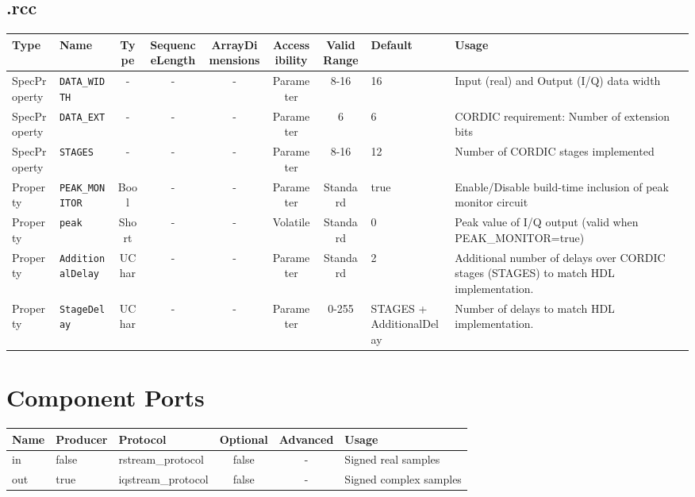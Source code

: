 \begin{landscape}
\subsection*{\comp.rcc}
\begin{scriptsize}
	\begin{tabular}{|p{3cm}|p{2cm}|c|c|c|c|c|p{1cm}|p{6cm}|}
		\hline
		\rowcolor{blue}
		Type         & Name              & Type & SequenceLength & ArrayDimensions & Accessibility & Valid Range & Default & Usage                                    \\
		\hline
		SpecProperty & \verb+DATA_WIDTH+ & -    & -              & -               & Parameter     & 8-16        & 16      & Input (real) and Output (I/Q) data width \\
		\hline
		SpecProperty & \verb+DATA_EXT+   & -    & -              & -               & Parameter     & 6           & 6       & CORDIC requirement: Number of extension bits \\
		\hline
		SpecProperty & \verb+STAGES+     & -    & -              & -               & Parameter     & 8-16        & 12      & Number of CORDIC stages implemented      \\
		\hline
		Property & \verb+PEAK_MONITOR+     & Bool    & -              & -               & Parameter     & Standard        & true      & Enable/Disable build-time inclusion of peak monitor circuit\\
		\hline
		Property & \verb+peak+     & Short & -              & -               & Volatile & Standard        & 0 & Peak value of I/Q output (valid when PEAK\_MONITOR=true)\\
		\hline
		Property & \verb+AdditionalDelay+     & UChar & -              & -               & Parameter        & Standard & 2 & Additional number of delays over CORDIC stages (STAGES) to match HDL implementation.\\
		\hline
		Property & \verb+StageDelay+     & UChar & -              & -               & Parameter        & 0-255 & STAGES + AdditionalDelay & Number of delays to match HDL implementation.\\
		\hline
	\end{tabular}
\end{scriptsize}

\section*{Component Ports}
\begin{scriptsize}
	\begin{tabular}{|M{2cm}|M{1.5cm}|M{4cm}|c|c|M{9cm}|}
		\hline
		Name & Producer & Protocol           & Optional & Advanced & Usage                  \\
		\hline
		in   & false    & rstream\_protocol  & false    & -        & Signed real samples    \\
		\hline
		out  & true     & iqstream\_protocol & false    & -        & Signed complex samples \\
		\hline
	\end{tabular}
\end{scriptsize}


\end{landscape}
